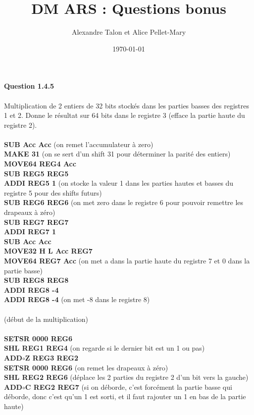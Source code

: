 \documentclass[a4paper,11pt]{article}
\title{DM ARS : Questions bonus}
\author{Alexandre Talon et Alice Pellet-Mary}
\date{\today}
\begin{document}
\maketitle

\textbf{Question 1.4.5}
\\
\\
Multiplication de 2 entiers de 32 bits stockés dans les parties basses des registres 1 et 2. Donne le résultat sur 64 bits dans le registre 3 (efface la partie haute du registre 2).\\
\\
\textbf{SUB Acc Acc}    (on remet l'accumulateur à zero)\\
\textbf{MAKE 31}        (on se sert d'un shift 31 pour déterminer la parité des entiers)\\
\textbf{MOVE64 REG4 Acc}\\
\textbf{SUB REG5 REG5}\\
\textbf{ADDI REG5 1}   (on stocke la valeur 1 dans les parties hautes et basses du registre 5 pour des shifts futurs)\\
\textbf{SUB REG6 REG6}  (on met zero dans le registre 6 pour pouvoir remettre les drapeaux à zéro)\\
\textbf{SUB REG7 REG7}\\
\textbf{ADDI REG7 1}\\
\textbf{SUB Acc Acc}\\
\textbf{MOVE32 H L Acc REG7}\\
\textbf{MOVE64 REG7 Acc} (on met a dans la partie haute du registre 7 et 0 dans la partie basse)\\
\textbf{SUB REG8 REG8}\\
\textbf{ADDI REG8 -4}\\
\textbf{ADDI REG8 -4 }   (on met -8 dans le registre 8)\\
\\
(début de la multiplication)\\
\\
\textbf{SETSR 0000 REG6}\\
\textbf{SHL REG1 REG4}   (on regarde si le dernier bit est un 1 ou pas)\\
\textbf{ADD$\circ$Z REG3 REG2} \\
\textbf{SETSR 0000 REG6} (on remet les drapeaux à zéro)\\
\textbf{SHL REG2 REG6  } (déplace les 2 parties du registre 2 d'un bit vers la gauche)\\
\textbf{ADD$\circ$C REG2 REG7 } (si on déborde, c'est forcément la partie basse qui déborde, donc c'est qu'un 1 est sorti, et il faut rajouter un 1 en bas de la partie haute)\\
\end{document}

